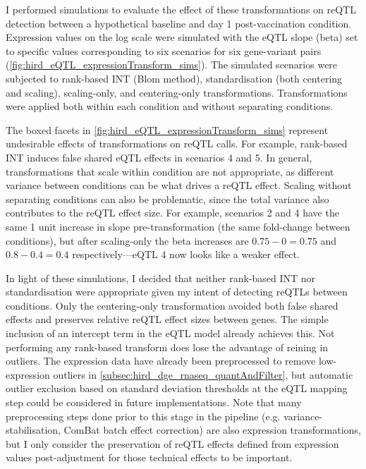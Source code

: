 
I performed simulations to evaluate the effect of these transformations on reQTL detection between a hypothetical baseline and day 1 post-vaccination condition.
Expression values on the log scale were simulated with the \gls{eQTL} slope (beta) set to specific values corresponding to six scenarios for six gene-variant pairs (\cref{fig:hird_eQTL_expressionTransform_sims}).
The simulated scenarios were subjected to rank-based \gls{INT} (Blom method\autocite{beasley2009RankBasedInverseNormal}), standardisation (both centering and scaling), scaling-only, and centering-only transformations.
Transformations were applied both within each condition and without separating conditions.

The boxed facets in \cref{fig:hird_eQTL_expressionTransform_sims} represent undesirable effects of transformations on \gls{reQTL} calls.
For example, rank-based \gls{INT} induces false shared \gls{eQTL} effects in scenarios 4 and 5.
In general, transformations that scale within condition are not appropriate, as different variance between conditions can be what drives a \gls{reQTL} effect.
Scaling without separating conditions can also be problematic, since the total variance also contributes to the \gls{reQTL} effect size.
For example, scenarios 2 and 4 have the same 1 unit increase in slope pre-transformation (the same fold-change between conditions), 
but after scaling-only the beta increases are $0.75-0=0.75$ and $0.8-0.4=0.4$ respectively---eQTL 4 now looks like a weaker effect.

In light of these simulations, I decided that neither rank-based \gls{INT} nor standardisation were appropriate given my intent of detecting \glspl{reQTL} between conditions.
Only the centering-only transformation avoided both false shared effects and preserves relative \gls{reQTL} effect sizes between genes.
The simple inclusion of an intercept term in the \gls{eQTL} model already achieves this.
Not performing any rank-based transform does lose the advantage of reining in outliers.
The expression data have already been preprocessed to remove low-expression outliers in \cref{subsec:hird_dge_rnaseq_quantAndFilter}, 
but automatic outlier exclusion based on standard deviation thresholds at the \gls{eQTL} mapping step could be considered in future implementations\autocite{vosa2018UnravelingPolygenicArchitecture}.
Note that many preprocessing steps done prior to this stage in the pipeline (e.g. variance-stabilisation, ComBat batch effect correction) are also expression transformations,
but I only consider the preservation of \gls{reQTL} effects defined from expression values post-adjustment for those technical effects to be important.

